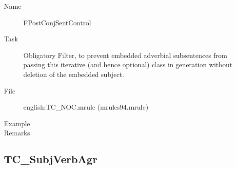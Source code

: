 \begin{description}
\vspace{1 cm}
\begin{description}
\item[Name] FPostConjSentControl
\item[Task] Obligatory Filter, to prevent embedded adverbial subsentences from 
passing this iterative (and hence optional) class in generation without 
deletion of the embedded subject.
\item[File] english:TC\_NOC.mrule (mrules94.mrule)
\item[Example] 
\item[Remarks] 
\end{description}

\end{description}

\newpage
\subsection{TC\_SubjVerbAgr}

